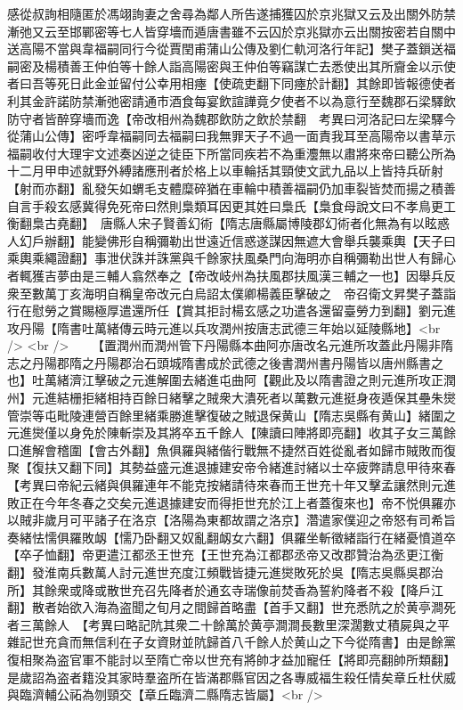 感從叔詢相隨匿於馮翊詢妻之舍尋為鄰人所告遂捕獲囚於京兆獄又云及出關外防禁漸弛又云至邯鄲密等七人皆穿墻而遁唐書雖不云囚於京兆獄亦云出關按密若自關中送高陽不當與韋福嗣同行今從賈閏甫蒲山公傳及劉仁軌河洛行年記】樊子蓋鎻送福嗣密及楊積善王仲伯等十餘人詣高陽密與王仲伯等竊謀亡去悉使出其所齎金以示使者曰吾等死日此金並留付公幸用相瘞【使疏吏翻下同瘞於計翻】其餘即皆報德使者利其金許諾防禁漸弛密請通市酒食每宴飲諠譁竟夕使者不以為意行至魏郡石梁驛飲防守者皆醉穿墻而逸【帝改相州為魏郡飲防之飲於禁翻　考異曰河洛記曰左梁驛今從蒲山公傳】密呼韋福嗣同去福嗣曰我無罪天子不過一面責我耳至高陽帝以書草示福嗣收付大理宇文述奏凶逆之徒臣下所當同疾若不為重灋無以肅將來帝曰聽公所為十二月甲申述就野外縛諸應刑者於格上以車輪括其頸使文武九品以上皆持兵斫射【射而亦翻】亂發矢如蝟毛支體糜碎猶在車輪中積善福嗣仍加車裂皆焚而揚之積善自言手殺玄感冀得免死帝曰然則梟類耳因更其姓曰梟氏【梟食母說文曰不孝鳥更工衡翻梟古堯翻】　唐縣人宋子賢善幻術【隋志唐縣屬博陵郡幻術者化無為有以眩惑人幻戶辦翻】能變佛形自稱彌勒出世遠近信惑遂謀因無遮大會舉兵襲乘輿【天子曰乘輿乘繩證翻】事泄伏誅并誅黨與千餘家扶風桑門向海明亦自稱彌勒出世人有歸心者輒獲吉夢由是三輔人翕然奉之【帝改岐州為扶風郡扶風漢三輔之一也】因舉兵反衆至數萬丁亥海明自稱皇帝改元白烏詔太僕卿楊義臣擊破之　帝召衛文昇樊子蓋詣行在慰勞之賞賜極厚遣還所任【賞其拒討楊玄感之功遣各還留臺勞力到翻】劉元進攻丹陽【隋書吐萬緒傳云時元進以兵攻潤州按唐志武德三年始以延陵縣地】<br />
<br />
　　【置潤州而潤州管下丹陽縣本曲阿亦唐改名元進所攻蓋此丹陽非隋志之丹陽郡隋之丹陽郡治石頭城隋書成於武德之後書潤州書丹陽皆以唐州縣書之也】吐萬緒濟江擊破之元進解圍去緒進屯曲阿【觀此及以隋書證之則元進所攻正潤州】元進結栅拒緒相持百餘日緒擊之賊衆大潰死者以萬數元進挺身夜遁保其壘朱爕管崇等屯毗陵連營百餘里緒乘勝進擊復破之賊退保黄山【隋志吳縣有黄山】緒圍之元進爕僅以身免於陳斬崇及其將卒五千餘人【陳讀曰陣將即亮翻】收其子女三萬餘口進解會稽圍【會古外翻】魚俱羅與緒偕行戰無不捷然百姓從亂者如歸市賊敗而復聚【復扶又翻下同】其勢益盛元進退據建安帝令緒進討緒以士卒疲弊請息甲待來春　【考異曰帝紀云緒與俱羅連年不能克按緒請待來春而王世充十年又擊孟讓然則元進敗正在今年冬春之交矣元進退據建安而得拒世充於江上者蓋復來也】帝不悦俱羅亦以賊非歲月可平諸子在洛京【洛陽為東都故謂之洛京】濳遣家僕迎之帝怒有司希旨奏緒怯懦俱羅敗衂【懦乃卧翻又奴亂翻衂女六翻】俱羅坐斬徵緒詣行在緒憂憤道卒【卒子恤翻】帝更遣江都丞王世充【王世充為江都郡丞帝又改郡贊治為丞更江衡翻】發淮南兵數萬人討元進世充度江頻戰皆捷元進爕敗死於吳【隋志吳縣吳郡治所】其餘衆或降或散世充召先降者於通玄寺瑞像前焚香為誓約降者不殺【降戶江翻】散者始欲入海為盗聞之旬月之間歸首略盡【首手又翻】世充悉阬之於黄亭澗死者三萬餘人　【考異曰略記阬其衆二十餘萬於黄亭澗澗長數里深濶數丈積屍與之平雜記世充貪而無信利在子女資財並阬歸首八千餘人於黄山之下今從隋書】由是餘黨復相聚為盗官軍不能討以至隋亡帝以世充有將帥才益加寵任【將即亮翻帥所類翻】　是歲詔為盗者籍没其家時羣盗所在皆滿郡縣官因之各專威福生殺任情矣章丘杜伏威與臨濟輔公祏為刎頸交【章丘臨濟二縣隋志皆屬】<br />
